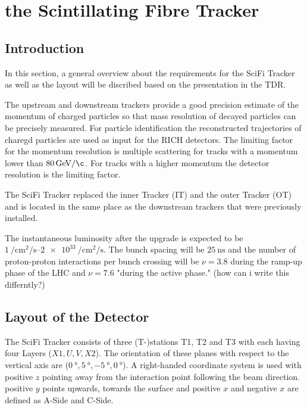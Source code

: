 \section{the Scintillating Fibre Tracker}
\label{sec:scifi}
\subsection{Introduction}

In this section, a general overview about the requirements for the SciFi Tracker as well as the layout will be discribed based on the presentation in the TDR\cite{scifiInfo}.

The upstream and downstream trackers provide a good precision estimate of the momentum of charged particles so that mass resolution of decayed particles can be precisely measured. %
For particle identification the reconstructed trajectories of charegd particles are used as input for the RICH detectors.
The limiting factor for the momentum resolution is multiple scattering for tracks with a momentum lower than $\SI{80}{\giga\electronvolt\per\c}$. For tracks with a higher momentum the detector resolution is the limiting factor.

The SciFi Tracker replaced the inner Tracker (IT) and the outer Tracker (OT) and is located in the same place as the downstream trackers that were previously installed.

  The instantaneous luminosity after the upgrade is expected to be $\SIrange{1}{2e33}{\per\centi\metre\squared\per\second}$. The bunch spacing will be $\SI{25}{\nano\second}$ and the number of proton-proton interactions per bunch crossing will be $\nu = 3.8$ during the ramp-up phase of the LHC and $\nu = 7.6$ "during the active phase." (how can i write this differntly?)

\subsection{Layout of the Detector}
The SciFi Tracker consists of three (T-)stations T1, T2 and T3 with each having four Layers ($X1, U, V, X2$). The orientation of these planes with respect to the vertical axis are ($\SI{0}{\degree}, \SI{+5}{\degree}, \SI{-5}{\degree}, \SI{0}{\degree}$).
A right-handed coordinate system is used with positive $z$ pointing away from the interaction point following the beam direction. positive $y$ points upwards, towards the surface and positive $x$ and negative $x$ are defined as A-Side and C-Side\cite{scifiInfo}.


